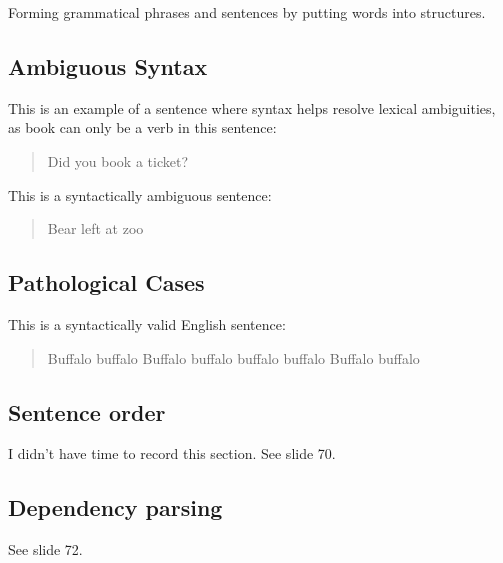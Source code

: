\documentclass{idc_msc}
\begin{document}
Forming grammatical phrases and sentences by putting words into structures.

\begin{center}
\end{center}

\subsection{Ambiguous Syntax}

This is an example of a sentence where syntax helps resolve lexical ambiguities, as book can only be a verb in this sentence:

\begin{quote}
Did you book a ticket?
\end{quote}

This is a syntactically ambiguous sentence:

\begin{quote}
Bear left at zoo
\end{quote}

\subsection{Pathological Cases}

This is a syntactically valid English sentence:

\begin{quote}
Buffalo buffalo Buffalo buffalo buffalo buffalo Buffalo buffalo
\end{quote}

\begin{center}
\end{center}

\subsection{Sentence order}

I didn't have time to record this section. See slide 70.

\subsection{Dependency parsing}

See slide 72.
\end{document}
